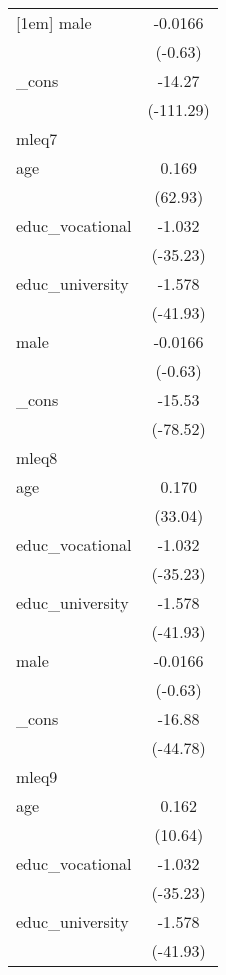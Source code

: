{\begin{tabular}{l*{1}{c}}
[1em]
male        &     -0.0166         \\
            &     (-0.63)         \\
[1em]
\_cons      &      -14.27\sym{***}\\
            &   (-111.29)         \\
\hline
mleq7       &                     \\
age         &       0.169\sym{***}\\
            &     (62.93)         \\
[1em]
educ\_vocational&      -1.032\sym{***}\\
            &    (-35.23)         \\
[1em]
educ\_university&      -1.578\sym{***}\\
            &    (-41.93)         \\
[1em]
male        &     -0.0166         \\
            &     (-0.63)         \\
[1em]
\_cons      &      -15.53\sym{***}\\
            &    (-78.52)         \\
\hline
mleq8       &                     \\
age         &       0.170\sym{***}\\
            &     (33.04)         \\
[1em]
educ\_vocational&      -1.032\sym{***}\\
            &    (-35.23)         \\
[1em]
educ\_university&      -1.578\sym{***}\\
            &    (-41.93)         \\
[1em]
male        &     -0.0166         \\
            &     (-0.63)         \\
[1em]
\_cons      &      -16.88\sym{***}\\
            &    (-44.78)         \\
\hline
mleq9       &                     \\
age         &       0.162\sym{***}\\
            &     (10.64)         \\
[1em]
educ\_vocational&      -1.032\sym{***}\\
            &    (-35.23)         \\
[1em]
educ\_university&      -1.578\sym{***}\\
            &    (-41.93)         \\

\end{tabular}}
